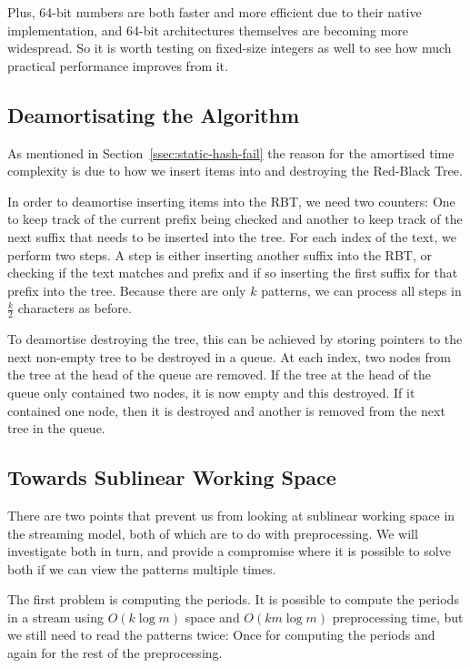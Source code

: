 \documentclass[ %
                    author={Dominic Joseph Moylett},
                    degree={MEng},
                     title={Dictionary Matching with Fingerprints},
                  subtitle={An Empirical Analysis},
                      type={research},
                      year={2015} ]{dissertation}
\begin{document}
Plus, 64-bit numbers are both faster and more efficient due to their native implementation, and 64-bit architectures themselves are becoming more widespread. So it is worth testing on fixed-size integers as well to see how much practical performance improves from it.

\subsection{Deamortisating the Algorithm}

As mentioned in Section~\ref{ssec:static-hash-fail} the reason for the amortised time complexity is due to how we insert items into and destroying the Red-Black Tree.

In order to deamortise inserting items into the RBT, we need two counters: One to keep track of the current prefix being checked and another to keep track of the next suffix that needs to be inserted into the tree. For each index of the text, we perform two steps. A step is either inserting another suffix into the RBT, or checking if the text matches and prefix and if so inserting the first suffix for that prefix into the tree. Because there are only $k$ patterns, we can process all steps in $\frac{k}{2}$ characters as before.

To deamortise destroying the tree, this can be achieved by storing pointers to the next non-empty tree to be destroyed in a queue. At each index, two nodes from the tree at the head of the queue are removed. If the tree at the head of the queue only contained two nodes, it is now empty and this destroyed. If it contained one node, then it is destroyed and another is removed from the next tree in the queue.

\subsection{Towards Sublinear Working Space}

There are two points that prevent us from looking at sublinear working space in the streaming model, both of which are to do with preprocessing. We will investigate both in turn, and provide a compromise where it is possible to solve both if we can view the patterns multiple times.

The first problem is computing the periods. It is possible to compute the periods in a stream\cite{ergun:sublinear-period} using $O(k\log m)$ space and $O(km\log m)$ preprocessing time, but we still need to read the patterns twice: Once for computing the periods and again for the rest of the preprocessing.
\end{document}
